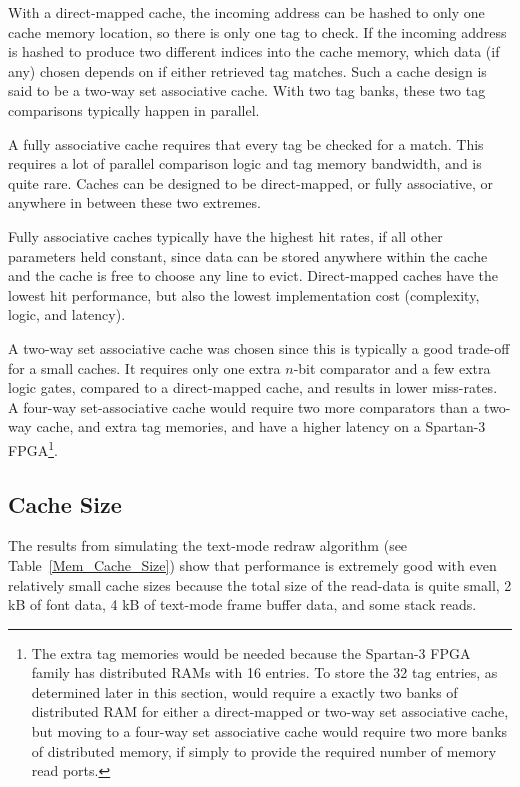 With a direct-mapped cache, the incoming address can be hashed to only one
cache memory location, so there is only one tag to check. If the incoming
address is hashed to produce two different indices into the cache memory,
which data (if any) chosen depends on if either retrieved tag matches. Such a
cache design is said to be a two-way set associative cache. With two tag
banks, these two tag comparisons typically happen in parallel\cite{Comp_Arch}.

A fully associative cache requires that every tag be checked for a match. This
requires a lot of parallel comparison logic and tag memory bandwidth, and is
quite rare\cite{Comp_Arch}. Caches can be designed to be direct-mapped, or fully
associative, or anywhere in between these two extremes.

Fully associative caches typically have the highest hit
rates\cite{parhami2005cam}, if all other parameters held constant, since data can
be stored anywhere within the cache and the cache is free to choose any line to
evict. Direct-mapped caches have the lowest hit performance, but also the lowest
implementation cost (complexity, logic, and latency)\cite{Comp_Arch,
parhami2005cam}.

A two-way set associative cache was chosen since this is typically a good
trade-off for a small caches. It requires only one extra $n$-bit comparator and a
few extra logic gates, compared to a direct-mapped cache, and results in lower
miss-rates\cite{parhami2005cam}. A four-way set-associative cache would require
two more comparators than a two-way cache, and extra tag memories, and have a
higher latency on a Spartan-3 FPGA\footnote{The extra tag memories would be
needed because the Spartan-3 FPGA family has distributed RAMs with 16 entries. To
store the 32 tag entries, as determined later in this section, would require a
exactly two banks of distributed RAM for either a direct-mapped or two-way set
associative cache, but moving to a four-way set associative cache would require
two more banks of distributed memory, if simply to provide the required number of
memory read ports.}.



\subsection{Cache Size}
The results from simulating the text-mode redraw algorithm (see
Table~\ref{Mem_Cache_Size}) show that performance is extremely good with even
relatively small cache sizes because the total size of the read-data is quite
small, 2 kB of font data, 4 kB of text-mode frame buffer data, and some stack
reads.

